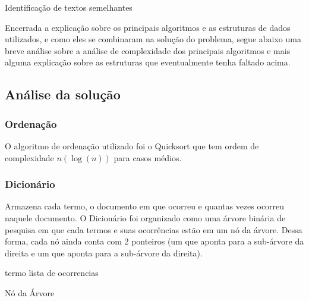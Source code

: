 \documentclass[12pt]{article}
\begin{document}
\begin{algorithm}[h!]
\begin{footnotesize}
\caption{Identificação de textos semelhantes}
\end{footnotesize}
\end{algorithm}

Encerrada a explicação sobre os principais algoritmos e as estruturas de dados
utilizados, e como eles se combinaram na solução do problema, segue abaixo uma
breve análise sobre a análise de complexidade dos principais algoritmos e mais
alguma explicação sobre as estruturas que eventualmente tenha faltado acima.

\subsection{Análise da solução}

\subsubsection{Ordenação}
O algoritmo de ordenação utilizado foi o Quicksort que tem ordem de complexidade
$n(\log(n))$ para casos médios.

\subsubsection{Dicionário}
Armazena cada termo, o documento em que ocorreu e quantas
vezes ocorreu naquele documento. O Dicionário foi organizado como uma árvore 
binária de pesquisa em que cada termos e suas ocorrências estão em um nó da 
árvore. Dessa forma, cada nó ainda conta com 2 ponteiros (um que aponta para 
a sub-árvore da direita e um que aponta para a sub-árvore da direita).

\begin{algorithm}[h!]
\begin{footnotesize}
	termo\;
	lista de ocorrencias\;
\caption{Nó da Árvore}
\end{footnotesize}
\end{algorithm}
\end{document}
